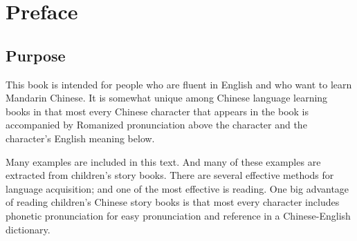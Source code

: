 ﻿%

\chapter*{Preface}


\section*{Purpose}
This book is intended for people who are fluent in English and who want to learn Mandarin Chinese.
It is somewhat unique among Chinese language learning books
in that most every Chinese character that appears in the book is accompanied by
Romanized pronunciation above the character and the character's English meaning below.

Many examples are included in this text.
And many of these examples are extracted from children's story books.
There are several effective methods for language acquisition;
and one of the most effective is reading.
One big advantage of reading children's Chinese story books is that
most every character includes phonetic pronunciation for easy pronunciation
and reference in a Chinese-English dictionary.

